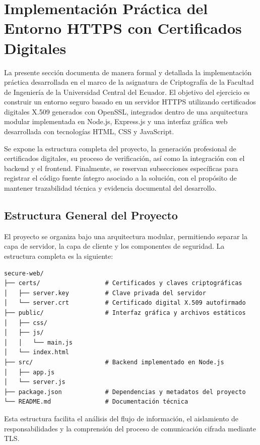 \section{Implementación Práctica del Entorno HTTPS con Certificados Digitales}

La presente sección documenta de manera formal y detallada la implementación práctica desarrollada en el marco de la asignatura de Criptografía de la Facultad de Ingeniería de la Universidad Central del Ecuador. El objetivo del ejercicio es construir un entorno seguro basado en un servidor HTTPS utilizando certificados digitales X.509 generados con OpenSSL, integrados dentro de una arquitectura modular implementada en Node.js, Express.js y una interfaz gráfica web desarrollada con tecnologías HTML, CSS y JavaScript.

Se expone la estructura completa del proyecto, la generación profesional de certificados digitales, su proceso de verificación, así como la integración con el backend y el frontend. Finalmente, se reservan subsecciones específicas para registrar el código fuente íntegro asociado a la solución, con el propósito de mantener trazabilidad técnica y evidencia documental del desarrollo.

\subsection{Estructura General del Proyecto}

El proyecto se organiza bajo una arquitectura modular, permitiendo separar la capa de servidor, la capa de cliente y los componentes de seguridad. La estructura completa es la siguiente:

\begin{verbatim}
secure-web/
├── certs/                  # Certificados y claves criptográficas
│   ├── server.key          # Clave privada del servidor
│   └── server.crt          # Certificado digital X.509 autofirmado
├── public/                 # Interfaz gráfica y archivos estáticos
│   ├── css/
│   ├── js/
│   │   └── main.js
│   └── index.html
├── src/                    # Backend implementado en Node.js
│   ├── app.js
│   └── server.js
├── package.json            # Dependencias y metadatos del proyecto
└── README.md               # Documentación técnica
\end{verbatim}

Esta estructura facilita el análisis del flujo de información, el aislamiento de responsabilidades y la comprensión del proceso de comunicación cifrada mediante TLS.

